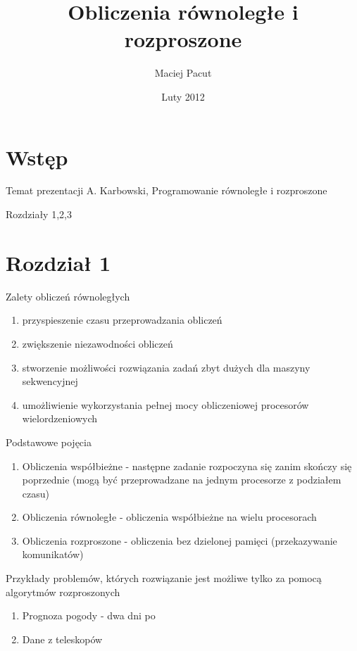 \documentclass{beamer}
\title{Obliczenia równoległe i rozproszone}
\author{Maciej Pacut}
\date{Luty 2012}
\begin{document}
\begin{frame}
  \titlepage
\end{frame}

\begin{frame}
  \tableofcontents[allowframebreaks]
\end{frame}

\section{Wstęp}
\begin{frame}{Temat prezentacji}
  A. Karbowski, Programowanie równoległe i rozproszone

  Rozdziały 1,2,3
\end{frame}
\section{Rozdział 1}

\begin{frame}{Zalety obliczeń równoległych}
  \begin{enumerate}[<+->]
  \item przyspieszenie czasu przeprowadzania obliczeń
  \item zwiększenie niezawodności obliczeń
  \item stworzenie możliwości rozwiązania zadań zbyt dużych dla maszyny sekwencyjnej
  \item umożliwienie wykorzystania pełnej mocy obliczeniowej procesorów wielordzeniowych
  \end{enumerate}
\end{frame}

\begin{frame}{Podstawowe pojęcia}
  \begin{enumerate}
  \item Obliczenia współbieżne - następne zadanie rozpoczyna się zanim skończy się poprzednie (mogą być przeprowadzane na jednym procesorze z podziałem czasu)
  \item Obliczenia równoległe - obliczenia współbieżne na wielu procesorach
  \item Obliczenia rozproszone - obliczenia bez dzielonej pamięci (przekazywanie komunikatów)
  \end{enumerate}
\end{frame}

\begin{frame}{Przykłady problemów, których rozwiązanie jest możliwe tylko za pomocą algorytmów rozproszonych}
  \begin{enumerate}
  \item Prognoza pogody - dwa dni po
  \item Dane z teleskopów
  \end{enumerate}
\end{frame}
\end{document}
